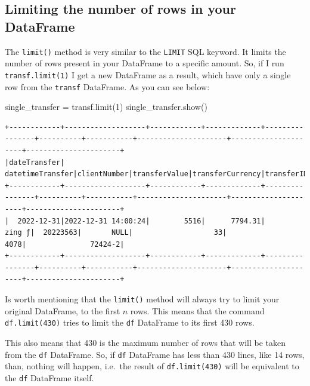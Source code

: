 \documentclass[
  11pt,
  letterpaper,
  DIV=11,
  numbers=noendperiod]{scrreprt}
\newenvironment{Shaded}{\begin{snugshade}}{\end{snugshade}}
\newcommand{\DecValTok}[1]{\textcolor[rgb]{0.68,0.00,0.00}{#1}}
\newcommand{\NormalTok}[1]{\textcolor[rgb]{0.00,0.23,0.31}{#1}}
\newcommand{\OperatorTok}[1]{\textcolor[rgb]{0.37,0.37,0.37}{#1}}
\begin{document}
\hypertarget{limiting-the-number-of-rows-in-your-dataframe}{%
\subsection{Limiting the number of rows in your
DataFrame}\label{limiting-the-number-of-rows-in-your-dataframe}}

The \texttt{limit()} method is very similar to the \texttt{LIMIT} SQL
keyword. It limits the number of rows present in your DataFrame to a
specific amount. So, if I run \texttt{transf.limit(1)} I get a new
DataFrame as a result, which have only a single row from the
\texttt{transf} DataFrame. As you can see below:

\begin{Shaded}
\begin{Highlighting}[]
\NormalTok{single\_transfer }\OperatorTok{=}\NormalTok{ transf.limit(}\DecValTok{1}\NormalTok{)}
\NormalTok{single\_transfer.show()}
\end{Highlighting}
\end{Shaded}

\begin{verbatim}
+------------+-------------------+------------+-------------+----------------+----------+-----------+---------------------+---------------------+----------------------+
|dateTransfer|   datetimeTransfer|clientNumber|transferValue|transferCurrency|transferID|transferLog|destinationBankNumber|destinationBankBranch|destinationBankAccount|
+------------+-------------------+------------+-------------+----------------+----------+-----------+---------------------+---------------------+----------------------+
|  2022-12-31|2022-12-31 14:00:24|        5516|      7794.31|          zing ƒ|  20223563|       NULL|                   33|                 4078|               72424-2|
+------------+-------------------+------------+-------------+----------------+----------+-----------+---------------------+---------------------+----------------------+
\end{verbatim}

Is worth mentioning that the \texttt{limit()} method will always try to
limit your original DataFrame, to the first \(n\) rows. This means that
the command \texttt{df.limit(430)} tries to limit the \texttt{df}
DataFrame to its first 430 rows.

This also means that 430 is the maximum number of rows that will be
taken from the \texttt{df} DataFrame. So, if \texttt{df} DataFrame has
less than 430 lines, like 14 rows, than, nothing will happen, i.e.~the
result of \texttt{df.limit(430)} will be equivalent to the \texttt{df}
DataFrame itself.
\end{document}

